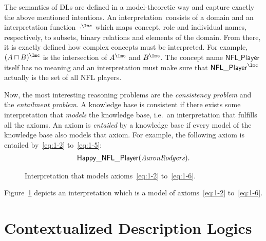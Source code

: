 The semantics of DLs are defined in a model-theoretic way and capture exactly the above mentioned
intentions.  An interpretation~\I consists of a domain and an interpretation function~$\cdot^{\I}$
which maps concept, role and individual names, respectively, to subsets, binary relations and elements of the
domain.  From there, it is exactly defined how complex concepts must be
interpreted. For example, $(A\sqcap B)^{\I}$ is the intersection of $A^{\I}$ and $B^{\I}$.  The
concept name $\mathsf{NFL\_Player}$ itself has no meaning and an interpretation must make sure that
$\mathsf{NFL\_Player}^{\I}$ actually is the set of all NFL players.

Now, the most interesting reasoning problems are the \emph{consistency problem} and the \emph{entailment
problem}. A knowledge base is consistent if there exists some interpretation that \emph{models} the
knowledge base, i.e.\ an interpretation that fulfills all the axioms. An axiom is \emph{entailed} by
a knowledge base if every model of the knowledge base also models that axiom. For example, the following axiom is
entailed by~\eqref{eq:1-2} to~\eqref{eq:1-5}:
\begin{gather}
  \mathsf{Happy\_NFL\_Player}(\text{\textit{AaronRodgers}}).\label{eq:1-6}
\end{gather}


\begin{figure}
  \centering
  \caption{Interpretation that models axioms~\eqref{eq:1-2} to~\eqref{eq:1-6}.}
  \label{fig:dl-example-intro}
\end{figure}

\noindent
Figure~\ref{fig:dl-example-intro} depicts an interpretation which is a model of axioms~\eqref{eq:1-2} to~\eqref{eq:1-6}.


\section{Contextualized Description Logics}
\label{sec:intro-contextualized-description-logics}




